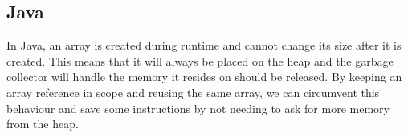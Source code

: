 %

\subsection{Java}
In Java, an array is created during runtime and cannot change its size after it is created. This means that it will always be placed on the heap and the garbage collector will handle the memory it resides on should be released. By keeping an array reference in scope and reusing the same array, we can circumvent this behaviour and save some instructions by not needing to ask for more memory from the heap.


